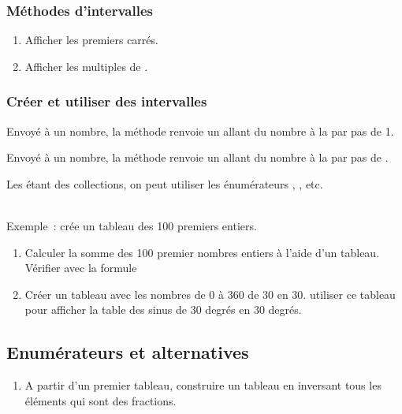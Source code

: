 \subsubsection{M\'ethodes d'intervalles}
\begin{enumerate}
\item Afficher les  premiers carr\'es.
\item Afficher les multiples de .
\end{enumerate}

\subsubsection{Cr\'eer et utiliser des intervalles}

Envoy\'e \`a un nombre,  la m\'ethode  renvoie
un  allant du nombre \`a la 
par pas de 1.

Envoy\'e \`a un nombre,  la m\'ethode 
renvoie un  allant du nombre \`a la 
par pas de .

Les  \'etant des collections, on peut utiliser les
\'enum\'erateurs , , etc.

~\\
Exemple~:  cr\'ee un tableau des 100 premiers entiers.

\begin{enumerate}
\item
Calculer la somme des 100 premier nombres entiers \`a l'aide d'un tableau.
V\'erifier avec la formule 

\item
Cr\'eer un tableau avec les nombres de $0$ \`a $360$ de $30$ en $30$.
utiliser ce tableau pour afficher la table des sinus de $30$ degr\'es en $30$ degr\'es.
\end{enumerate}

\subsection{Enum\'erateurs et alternatives}
\begin{enumerate}
\item A partir d'un premier tableau, construire un tableau en
inversant tous les \'el\'ements qui sont des fractions.
\end{enumerate}

